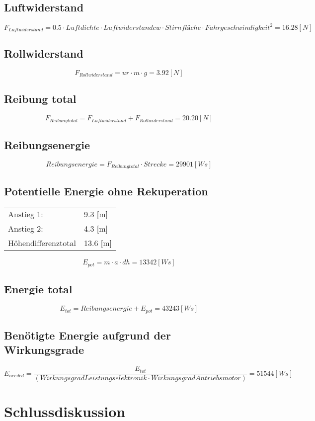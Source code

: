 \documentclass[a4,paper,fleqn]{article}
\begin{document}
\subsection{Luftwiderstand} 
\[ F_{Luftwiderstand} = 0.5 \cdot Luftdichte \cdot Luftwiderstand cw \cdot Stirnfläche \cdot Fahrgeschwindigkeit^2 = 16.28 [N] \]

\subsection{Rollwiderstand} 
\[ F_{Rollwiderstand} = ur  \cdot  m  \cdot  g = 3.92 [N]\]

\subsection{Reibung total}
\[ F_{Reibungtotal} = F_{Luftwiderstand} + F_{Rollwiderstand} = 20.20 [N]\]

\subsection{Reibungsenergie}
\[ Reibungsenergie = F_{Reibungtotal}  \cdot  Strecke = 29901 [Ws]\]

\subsection{Potentielle Energie ohne Rekuperation}
\begin{tabular}{ll}
Anstieg 1: & 9.3 [m]\\
Anstieg 2: & 4.3 [m]\\
Höhendifferenztotal & 13.6 [m]\\
\end{tabular}
\[ E_{pot} = m \cdot a \cdot dh = 13342 [Ws]\]

\subsection{Energie total}
\[ E_{tot} = Reibungsenergie + E_{pot} = 43243 [Ws]\]

\subsection{Benötigte Energie aufgrund der Wirkungsgrade}
\[ E_{needed} = \frac{E_{tot}}{(Wirkungsgrad Leistungselektronik \cdot Wirkungsgrad Antriebsmotor)} = 51544 [Ws] \]

\section{Schlussdiskussion}

\clearpage
\begin{appendix}

\end{appendix}
\end{document}
